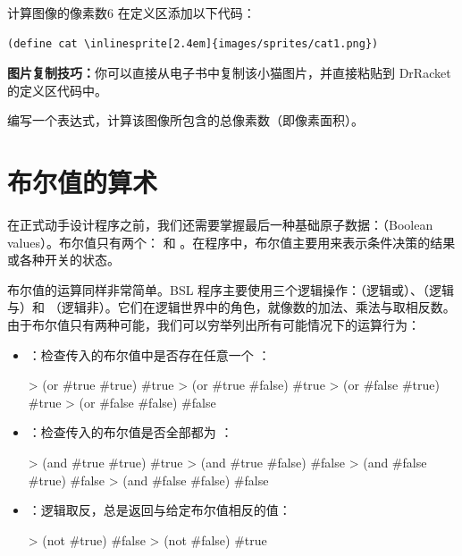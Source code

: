 \begin{exercise}{计算图像的像素数}{6}
在定义区添加以下代码：
\begin{stepperbox}
\begin{Verbatim}[commandchars=\\\{\}, fontsize=\footnotesize]
(define cat \inlinesprite[2.4em]{images/sprites/cat1.png})
\end{Verbatim}
\end{stepperbox}

\textbf{图片复制技巧：}你可以直接从电子书中复制该小猫图片，并直接粘贴到 DrRacket 的定义区代码中。

编写一个表达式，计算该图像所包含的总像素数（即像素面积）。
\end{exercise}


\section{布尔值的算术}
\label{sec:1.5}

在正式动手设计程序之前，我们还需要掌握最后一种基础原子数据：（Boolean values）。布尔值只有两个： 和 。在程序中，布尔值主要用来表示条件决策的结果或各种开关的状态。

布尔值的运算同样非常简单。BSL 程序主要使用三个逻辑操作：（逻辑或）、（逻辑与）和 （逻辑非）。它们在逻辑世界中的角色，就像数的加法、乘法与取相反数。由于布尔值只有两种可能，我们可以穷举列出所有可能情况下的运算行为：
\begin{itemize}
  \item {}：检查传入的布尔值中是否存在任意一个 ：
\begin{replbox}
> (or #true #true)
#true
> (or #true #false)
#true
> (or #false #true)
#true
> (or #false #false)
#false
\end{replbox}

  \item {}：检查传入的布尔值是否全部都为 ：
\begin{replbox}
> (and #true #true)
#true
> (and #true #false)
#false
> (and #false #true)
#false
> (and #false #false)
#false
\end{replbox}

  \item {}：逻辑取反，总是返回与给定布尔值相反的值：
\begin{replbox}
> (not #true)
#false
> (not #false)
#true
\end{replbox}
\end{itemize}

